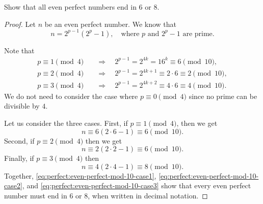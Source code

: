  Show that all even perfect numbers end in $6$ or $8$.
\begin{proof}
  Let $n$ be an even perfect number. We know that
  \begin{equation*}
    n = 2^{p-1}(2^p - 1),
    \quad\text{where $p$ and $2^p-1$ are prime}.
  \end{equation*}

  Note that
  \begin{align*}
    p\equiv1\pmod4
    &\quad\Rightarrow\quad
      2^{p-1} = 2^{4k} = 16^k \equiv 6\pmod{10}, \\
    p\equiv2\pmod4
    &\quad\Rightarrow\quad
      2^{p-1} = 2^{4k+1} \equiv 2\cdot6 \equiv 2\pmod{10}, \\
    p\equiv3\pmod4
    &\quad\Rightarrow\quad
      2^{p-1} = 2^{4k+2} \equiv 4\cdot6 \equiv 4\pmod{10}.
  \end{align*}
  We do not need to consider the case where $p\equiv0\pmod4$ since no
  prime can be divisible by $4$.

  Let us consider the three cases. First, if $p\equiv1\pmod4$, then we
  get
  \begin{equation}
    \label{eq:perfect:even-perfect-mod-10-case1}
    n \equiv 6(2\cdot6 - 1) \equiv 6\pmod{10}.
  \end{equation}
  Second, if $p\equiv2\pmod{4}$ then we get
  \begin{equation}
    \label{eq:perfect:even-perfect-mod-10-case2}
    n \equiv 2(2\cdot2 - 1) \equiv 6\pmod{10}.
  \end{equation}
  Finally, if $p\equiv3\pmod{4}$ then
  \begin{equation}
    \label{eq:perfect:even-perfect-mod-10-case3}
    n \equiv 4(2\cdot4 - 1) \equiv 8\pmod{10}.
  \end{equation}
  Together, \ref{eq:perfect:even-perfect-mod-10-case1},
  \ref{eq:perfect:even-perfect-mod-10-case2}, and
  \ref{eq:perfect:even-perfect-mod-10-case3} show that every even
  perfect number must end in $6$ or $8$, when written in decimal
  notation.
\end{proof}


